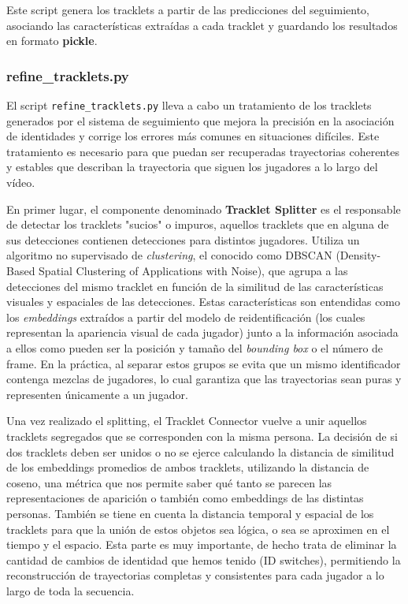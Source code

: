 \documentclass[12pt, a4paper, twoside]{article}
\begin{document}
	Este script genera los tracklets a partir de las predicciones del seguimiento, asociando las características extraídas a cada tracklet y guardando los resultados en formato \textbf{pickle}.
	
	\subsubsection{refine\_tracklets.py}
	
	El script \texttt{refine\_tracklets.py} lleva a cabo un tratamiento de los tracklets generados por el sistema de seguimiento que mejora la precisión en la asociación de identidades y corrige los errores más comunes en situaciones difíciles. Este tratamiento es necesario para que puedan ser recuperadas trayectorias coherentes y estables que describan la trayectoria que siguen los jugadores a lo largo del vídeo.
	
	En primer lugar, el componente denominado \textbf{Tracklet Splitter} es el responsable de detectar los tracklets "sucios" o impuros, aquellos tracklets que en alguna de sus detecciones contienen detecciones para distintos jugadores. Utiliza un algoritmo no supervisado de \textit{clustering}, el conocido como DBSCAN (Density-Based Spatial Clustering of Applications with Noise), que agrupa a las detecciones del mismo tracklet en función de la similitud de las características visuales y espaciales de las detecciones. Estas características son entendidas como los \textit{embeddings} extraídos a partir del modelo de reidentificación (los cuales representan la apariencia visual de cada jugador) junto a la información asociada a ellos como pueden ser la posición y tamaño del \textit{bounding box} o el número de frame. En la práctica, al separar estos grupos se evita que un mismo identificador contenga mezclas de jugadores, lo cual garantiza que las trayectorias sean puras y representen únicamente a un jugador.
	
	Una vez realizado el splitting, el Tracklet Connector vuelve a unir aquellos tracklets segregados que se corresponden con la misma persona. La decisión de si dos tracklets deben ser unidos o no se ejerce calculando la distancia de similitud de los embeddings promedios de ambos tracklets, utilizando la distancia de coseno, una métrica que nos permite saber qué tanto se parecen las representaciones de aparición o también como embeddings de las distintas personas. También se tiene en cuenta la distancia temporal y espacial de los tracklets para que la unión de estos objetos sea lógica, o sea se aproximen en el tiempo y el espacio. Esta parte es muy importante, de hecho trata de eliminar la cantidad de cambios de identidad que hemos tenido (ID switches), permitiendo la reconstrucción de trayectorias completas y consistentes para cada jugador a lo largo de toda la secuencia.
	
\end{document}
